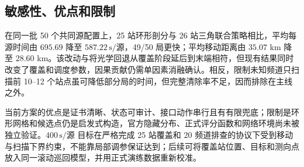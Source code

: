 \subsection{敏感性、优点和限制}
在同一批 50 个共同源配置上，25 站环形剖分与 26 站三角联合策略相比，平均每源时间由 $695.69$ 降至 $587.22\,\mathrm s/源$，49/50 局更快；平均移动距离由 $35.07$ km 降至 $28.60$ km。该改动与将光学回退从覆盖阶段延后到末端相符，但现有结果同时改变了覆盖和调度参数，因果贡献仍需单因素消融确认。相反，限制未知频道只扫描前 10--12 个站点虽可降低部分局的时间，但完整清除率不足，因而排除在主线之外。

当前方案的优点是证书清晰、状态可审计、接口动作串行且有有限兜底；限制是环形网格和候选点仍是启发式构造，官方隐藏分布、正式评分函数和网络环境尚未被独立验证。$400\,\mathrm s/源$ 目标在严格完成 25 站覆盖和 20 频道排查的协议下受到移动与扫描下界约束，不能靠局部调参保证达到；后续可将覆盖站位置、目标和测向点放入同一滚动巡回模型，并用正式演练数据重新校准。
